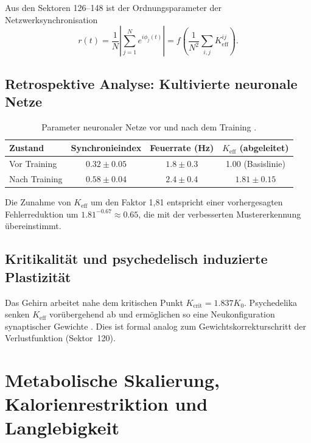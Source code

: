 \documentclass[11pt,a4paper]{article}
\begin{document}
	Aus den Sektoren 126--148 ist der Ordnungsparameter der Netzwerksynchronisation
	\begin{equation}
		r(t) = \frac{1}{N}\left|\sum_{j=1}^N e^{i\phi_j(t)}\right| = f\left(\frac{1}{N^2}\sum_{i,j} K_{\text{eff}}^{ij}\right).
		\label{eq:sync_order}
	\end{equation}
	
	\subsection{Retrospektive Analyse: Kultivierte neuronale Netze}
	
	\begin{table}[H]
		\centering
		\caption{Parameter neuronaler Netze vor und nach dem Training \cite{PLOS2025b}.}
		\label{tab:neural-training}
		\begin{tabular}{lccc}
			\toprule
			\textbf{Zustand} & \textbf{Synchronieindex} & \textbf{Feuerrate (Hz)} & \(K_{\text{eff}}\) (abgeleitet) \\
			\midrule
			Vor Training & \(0.32 \pm 0.05\) & \(1.8 \pm 0.3\) & 1.00 (Basislinie) \\
			Nach Training & \(0.58 \pm 0.04\) & \(2.4 \pm 0.4\) & \(1.81 \pm 0.15\) \\
			\bottomrule
		\end{tabular}
	\end{table}
	
	Die Zunahme von \(K_{\text{eff}}\) um den Faktor 1,81 entspricht einer vorhergesagten Fehlerreduktion um \(1.81^{-0.67} \approx 0.65\), die mit der verbesserten Mustererkennung übereinstimmt.
	
	\subsection{Kritikalität und psychedelisch induzierte Plastizität}
	
	Das Gehirn arbeitet nahe dem kritischen Punkt \(K_{\mathrm{crit}} = 1.837 K_0\). Psychedelika senken \(K_{\text{eff}}\) vorübergehend ab und ermöglichen so eine Neukonfiguration synaptischer Gewichte \cite{CarhartHarris2018, CarhartHarris2023}. Dies ist formal analog zum Gewichtskorrekturschritt der Verlustfunktion (Sektor~120).
	
	\section{Metabolische Skalierung, Kalorienrestriktion und Langlebigkeit}
	\label{sec:metabolism}
	
\end{document}
